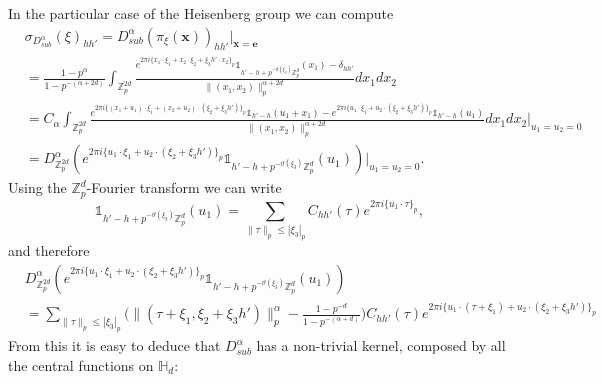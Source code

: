 \documentclass[12pt, reqno]{amsart}
\newcommand{\Z}{\mathbb{Z}}
\newcommand{\1}{\mathds{1}}
\begin{document}
In the particular case of the Heisenberg group we can compute 
\begin{align*}
    &\sigma_{D^\alpha_{sub}} (\xi)_{hh'}  = D^\alpha_{sub}(\pi_\xi(\mathbf{x}))_{hh'} |_{\mathbf{x}=\mathbf{e}} \\&= \frac{1-p^\alpha}{1-p^{-(\alpha + 2d)}}\int_{\Z_p^{2d}} \frac{e^{2\pi i \{x_1 \cdot \xi_1 + x_2 \cdot \xi_2 + \xi_3 h' \cdot x_2\}_p} \mathbb{1}_{h'-h + p^{-\vartheta(\xi_3)}\mathbb{Z}_p^d}(x_1) - \delta_{hh'}}{\|(x_1, x_2)\|_p^{\alpha + 2d}}dx_1 dx_2\\&=C_\alpha  \int_{\Z_p^{2d}} \frac{e^{2\pi i \{(x_1+u_1) \cdot \xi_1 + (x_2+u_2) \cdot (\xi_2 + \xi_3 h')\}_p} \mathbb{1}_{h'-h}(u_1+x_1) - e^{2\pi i \{u_1 \cdot \xi_1 + u_2 \cdot (\xi_2 + \xi_3 h')\}_p}\mathbb{1}_{h'-h }(u_1)}{\|(x_1, x_2)\|_p^{\alpha + 2d}}dx_1 dx_2 \big|_{u_1=u_2=0} \\ &= D^\alpha_{\Z_p^{2d}} (e^{2\pi i \{u_1 \cdot \xi_1 + u_2 \cdot (\xi_2 + \xi_3 h')\}_p}\mathbb{1}_{h'-h + p^{-\vartheta(\xi_3)}\mathbb{Z}_p^d}(u_1))|_{u_1=u_2=0}.
\end{align*}
Using the $\Z_p^d$-Fourier transform we can write $$\mathbb{1}_{h'-h + p^{-\vartheta(\xi_3)}\mathbb{Z}_p^d}(u_1) = \sum_{\| \tau \|_p \leq |\xi_3|_p} C_{hh'}(\tau) e^{2 \pi i \{ u_1 \cdot \tau  \}_p },$$and therefore \begin{align*}
    &D^\alpha_{\Z_p^{2d}} (e^{2\pi i \{u_1 \cdot \xi_1 + u_2 \cdot (\xi_2 + \xi_3 h')\}_p}\mathbb{1}_{h'-h + p^{-\vartheta(\xi_3)}\mathbb{Z}_p^d}(u_1)) \\ &= \sum_{\| \tau \|_p \leq |\xi_3|_p}  \Big( \|(\tau + \xi_1 , \xi_2 + \xi_3 h') \|_p^\alpha - \frac{1 - p^{-d}}{1 - p^{- (\alpha + d)}} \Big) C_{hh'}(\tau) e^{2 \pi i \{ u_1 \cdot (\tau+ \xi_1)+ u_2 \cdot ( \xi_2+ \xi_3 h' )  \}_p } 
\end{align*}
From this it is easy to deduce that $D^\alpha_{sub}$ has a non-trivial kernel, composed by all the central functions on $\mathbb{H}_d$: 
\end{document}
